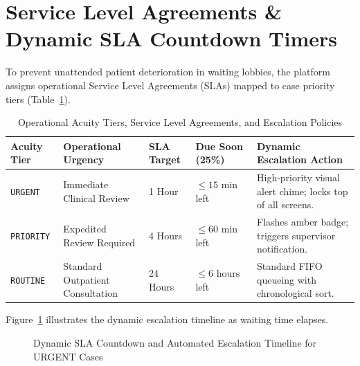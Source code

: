 \documentclass[11pt,a4paper,oneside]{report}
\begin{document}
\section{Service Level Agreements \& Dynamic SLA Countdown Timers}
To prevent unattended patient deterioration in waiting lobbies, the platform assigns operational Service Level Agreements (SLAs) mapped to case priority tiers (Table~\ref{tab:sla_table}).

\begin{table}[htbp]
  \centering
  \small
  \caption{Operational Acuity Tiers, Service Level Agreements, and Escalation Policies}
  \label{tab:sla_table}
  \begin{tabularx}{\textwidth}{lp{3.2cm}p{1.8cm}p{2.2cm}X}
    \toprule
    \textbf{Acuity Tier} & \textbf{Operational Urgency} & \textbf{SLA Target} & \textbf{Due Soon (25\%)} & \textbf{Dynamic Escalation Action} \\
    \midrule
    \texttt{URGENT} & Immediate Clinical Review & 1 Hour & $\le 15\text{ min}$ left & High-priority visual alert chime; locks top of all screens. \\
    \addlinespace
    \texttt{PRIORITY} & Expedited Review Required & 4 Hours & $\le 60\text{ min}$ left & Flashes amber badge; triggers supervisor notification. \\
    \addlinespace
    \texttt{ROUTINE} & Standard Outpatient Consultation & 24 Hours & $\le 6\text{ hours}$ left & Standard FIFO queueing with chronological sort. \\
    \bottomrule
  \end{tabularx}
\end{table}

Figure~\ref{fig:sla_timeline} illustrates the dynamic escalation timeline as waiting time elapses.

\begin{figure}[htbp]
  \centering
  \caption{Dynamic SLA Countdown and Automated Escalation Timeline for URGENT Cases}
  \label{fig:sla_timeline}
\end{figure}
\end{document}
